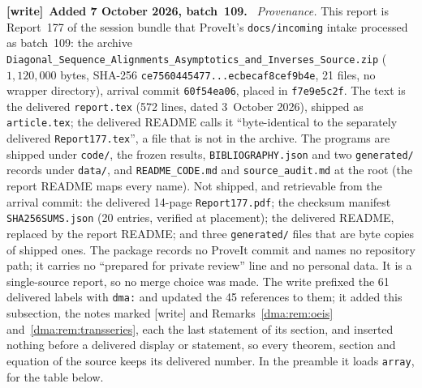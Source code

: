 \documentclass[11pt,letterpaper]{article}
\theoremstyle{remark}\newtheorem{remark}[theorem]{Remark}
\newcommand{\file}[1]{\nolinkurl{#1}}
\newenvironment{writenote}[1][]{\par\smallskip\begingroup\small
 \noindent\textbf{[write]}\if\relax\detokenize{#1}\relax\else~\textbf{#1.}\fi\ }%
 {\par\endgroup\smallskip}
\begin{document}
\begin{writenote}[Added 7 October 2026, batch~109]
\emph{Provenance.} This report is Report~177 of the session bundle that
ProveIt's \file{docs/incoming} intake processed as batch~109: the archive
\file{Diagonal_Sequence_Alignments_Asymptotics_and_Inverses_Source.zip}
($1{,}120{,}000$ bytes, SHA-256 \file{ce7560445477...ecbecaf8cef9b4e}, 21
files, no wrapper directory), arrival commit \file{60f54ea06}, placed in
\file{f7e9e5c2f}. The text is the delivered \file{report.tex} (572 lines,
dated 3~October 2026), shipped as \file{article.tex}; the delivered README
calls it ``byte-identical to the separately delivered \file{Report177.tex}'',
a file that is not in the archive. The programs are shipped under
\file{code/}, the frozen results, \file{BIBLIOGRAPHY.json} and two
\file{generated/} records under \file{data/}, and \file{README_CODE.md} and
\file{source_audit.md} at the root (the report README maps every name). Not
shipped, and retrievable from the arrival commit: the delivered 14-page
\file{Report177.pdf}; the checksum manifest \file{SHA256SUMS.json} (20
entries, verified at placement); the delivered README, replaced by the
report README; and three \file{generated/} files that are byte copies of
shipped ones. The package records no ProveIt commit and names no repository
path; it carries no ``prepared for private review'' line and no personal
data. It is a single-source report, so no merge choice was made. The write
prefixed the 61 delivered labels with \file{dma:} and updated the 45
references to them; it added this subsection, the notes marked [write] and
Remarks~\ref{dma:rem:oeis} and~\ref{dma:rem:transseries}, each the last
statement of its section, and inserted nothing before a delivered display or
statement, so every theorem, section and equation of the source keeps its
delivered number. In the preamble it loads \file{array}, for the table below.


\end{writenote}
\end{document}
